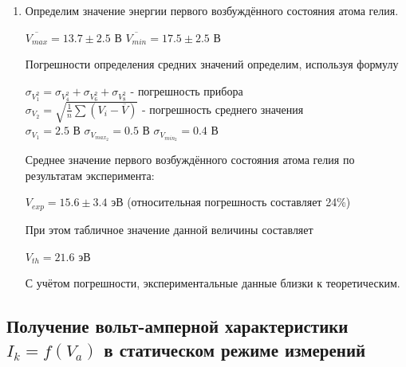 \documentclass[a4paper, 12pt]{article}
\begin{document}
\begin{enumerate}
\item Определим значение энергии первого возбуждённого состояния атома гелия. 
\begin{center}
    $\overline{V_{max}} = 13.7 \pm 2.5$ В \hspace{1cm} $\overline{V_{min}} = 17.5 \pm 2.5$ В
\end{center}
Погрешности определения средних значений определим, используя формулу
\begin{center}
    $\sigma_{V^2_1} = \sigma_{V_4^2} + \sigma_{V_6^2} + \sigma_{V_8^2}$ - погрешность прибора \\
    $\sigma_{V_2} = \sqrt{\frac{1}{n}\sum (V_i - \overline{V})}$ -  погрешность среднего значения \\
    $\sigma_{V_1} = 2.5$ В \hspace{1cm} $\sigma_{V_{{max}_2}} = 0.5 $ В  \hspace{1cm} $\sigma_{V_{{min}_2}} = 0.4$ В
\end{center}

Среднее значение первого возбуждённого состояния атома гелия по результатам эксперимента:
\begin{center}
    $V_{exp} = 15.6 \pm 3.4$ эВ (относительная погрешность составляет 24\%)
\end{center}
При этом табличное значение данной величины составляет
\begin{center}
    $V_{th} = 21.6$ эВ
\end{center}
С учётом погрешности, экспериментальные данные близки к теоретическим.

\end{enumerate}

\subsection{Получение вольт-амперной характеристики $I_k = f(V_a)$ в статическом режиме измерений}
\end{document}
